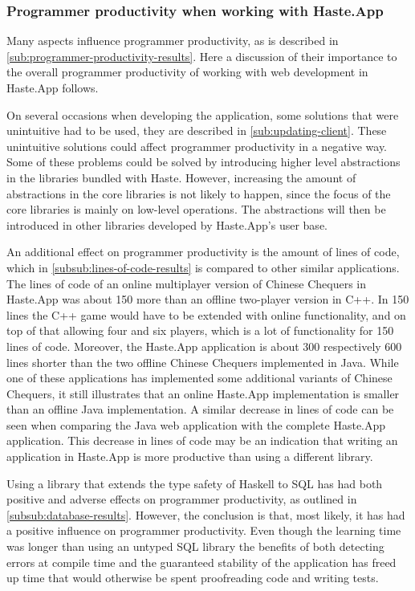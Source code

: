 \documentclass[a4paper]{article}
\begin{document}
\subsubsection{Programmer productivity when working with Haste.App}
Many aspects influence programmer productivity, as is described in \cref{sub:programmer-productivity-results}. Here a discussion of their importance to the overall programmer productivity of working with web development in Haste.App follows.

On several occasions when developing the application, some solutions that were unintuitive had to be used, they are described in \cref{sub:updating-client}. These unintuitive solutions could affect programmer productivity in a negative way. Some of these problems could be solved by introducing higher level abstractions in the libraries bundled with Haste. However, increasing the amount of abstractions in the core libraries is not likely to happen, since the focus of the core libraries is mainly on low-level operations. The abstractions will then be introduced in other libraries developed by Haste.App's user base.



An additional effect on programmer productivity is the amount of lines of code, which in \cref{subsub:lines-of-code-results} is compared to other similar applications. The lines of code of an online multiplayer version of Chinese Chequers in Haste.App was about 150 more than an offline two-player version in C++. In 150 lines the C++ game would have to be extended with online functionality, and on top of that allowing four and six players, which is a lot of functionality for 150 lines of code. Moreover, the Haste.App application is about 300 respectively 600 lines shorter than the two offline Chinese Chequers implemented in Java. While one of these applications has implemented some additional variants of Chinese Chequers, it still illustrates that an online Haste.App implementation is smaller than an offline Java implementation. A similar decrease in lines of code can be seen when comparing the Java web application with the complete Haste.App application. This decrease in lines of code may be an indication that writing an application in Haste.App is more productive than using a different library.

Using a library that extends the type safety of Haskell to SQL has had both positive and adverse effects on programmer productivity, as outlined in \cref{subsub:database-results}. However, the conclusion is that, most likely, it has had a positive influence on programmer productivity. Even though the learning time was longer than using an untyped SQL library the benefits of both detecting errors at compile time and the guaranteed stability of the application has freed up time that would otherwise be spent proofreading code and writing tests.
\end{document}
